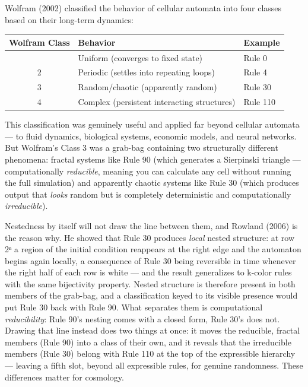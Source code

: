 \documentclass[
]{article}
\begin{document}
Wolfram (2002) classified the behavior of cellular automata into four
classes based on their long-term dynamics:

\begin{longtable}[]{@{}cll@{}}
\toprule\noalign{}
Wolfram Class & Behavior & Example \\
\midrule\noalign{}
\endhead
\bottomrule\noalign{}
\endlastfoot
1 & Uniform (converges to fixed state) & Rule 0 \\
2 & Periodic (settles into repeating loops) & Rule 4 \\
3 & Random/chaotic (apparently random) & Rule 30 \\
4 & Complex (persistent interacting structures) & Rule 110 \\
\end{longtable}

This classification was genuinely useful and applied far beyond cellular
automata --- to fluid dynamics, biological systems, economic models, and
neural networks. But Wolfram's Class 3 was a grab-bag containing two
structurally different phenomena: fractal systems like Rule 90 (which
generates a Sierpinski triangle --- computationally \emph{reducible},
meaning you can calculate any cell without running the full simulation)
and apparently chaotic systems like Rule 30 (which produces output that
\emph{looks} random but is completely deterministic and computationally
\emph{irreducible}).

Nestedness by itself will not draw the line between them, and Rowland
(2006) is the reason why. He showed that Rule 30 produces \emph{local}
nested structure: at row 2ⁿ a region of the initial condition reappears
at the right edge and the automaton begins again locally, a consequence
of Rule 30 being reversible in time whenever the right half of each row
is white --- and the result generalizes to k-color rules with the same
bijectivity property. Nested structure is therefore present in both
members of the grab-bag, and a classification keyed to its visible
presence would put Rule 30 back with Rule 90. What separates them is
computational \emph{reducibility}: Rule 90's nesting comes with a closed
form, Rule 30's does not. Drawing that line instead does two things at
once: it moves the reducible, fractal members (Rule 90) into a class of
their own, and it reveals that the irreducible members (Rule 30) belong
with Rule 110 at the top of the expressible hierarchy --- leaving a
fifth slot, beyond all expressible rules, for genuine randomness. These
differences matter for cosmology.
\end{document}
